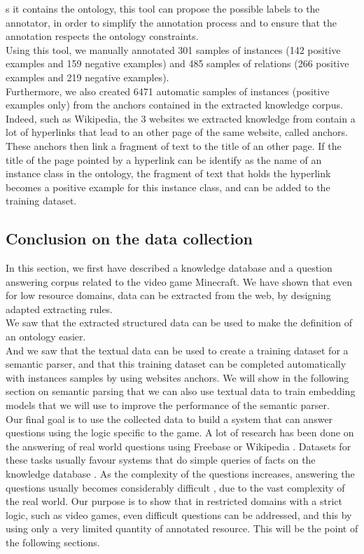 \documentclass[12pt]{article}
\begin{document}
s it contains the ontology, this tool can propose the possible labels to the annotator, in order to simplify the annotation process and to ensure that the annotation respects the ontology constraints.\\
Using this tool, we manually annotated 301 samples of instances (142 positive examples and 159 negative examples) and 485 samples of relations (266 positive examples and 219 negative examples).\\
Furthermore, we also created 6471 automatic samples of instances (positive examples only) from the anchors contained in the extracted knowledge corpus. Indeed, such as Wikipedia, the 3 websites we extracted knowledge from contain a lot of hyperlinks that lead to an other page of the same website, called anchors. These anchors then link a fragment of text to the title of an other page. If the title of the page pointed by a hyperlink can be identify as the name of an instance class in the ontology, the fragment of text that holds the hyperlink becomes a positive example for this instance class, and can be added to the training dataset.

\subsection{Conclusion on the data collection}

In this section, we first have described a knowledge database and a question answering corpus related to the video game Minecraft. We have shown that even for low resource domains, data can be extracted from the web, by designing adapted extracting rules.\\
We saw that the extracted structured data can be used to make the definition of an ontology easier.\\
And we saw that the textual data can be used to create a training dataset for a semantic parser, and that this training dataset can be completed automatically with instances samples by using websites anchors. We will show in the following section on semantic parsing that we can also use textual data to train embedding models that we will use to improve the performance of the semantic parser.\\

Our final goal is to use the collected data to build a system that can answer questions using the logic specific to the game. A lot of research has been done on the answering of real world questions using Freebase \cite{berant2014semantic,yao2015lean} or Wikipedia \cite{pasupat2015compositional}. Datasets for these tasks usually favour systems that do simple queries of facts on the knowledge database \cite{yao2015lean}. As the complexity of the questions increases, answering the questions usually becomes considerably difficult \cite{pasupat2015compositional}, due to the vast complexity of the real world. Our purpose is to show that in restricted domains with a strict logic, such as video games, even difficult questions can be addressed, and this by using only a very limited quantity of annotated resource. This will be the point of the following sections.
\end{document}
